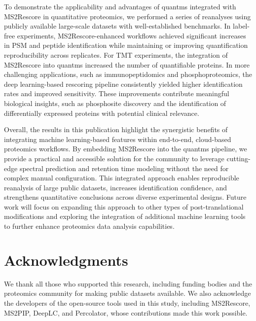\documentclass[12pt]{article}
\begin{document}
To demonstrate the applicability and advantages of quantms integrated with MS2Rescore in quantitative proteomics, we performed a series of reanalyses using publicly available large-scale datasets with well-established benchmarks. In label-free experiments, MS2Rescore-enhanced workflows achieved significant increases in PSM and peptide identification while maintaining or improving quantification reproducibility across replicates. For TMT experiments, the integration of MS2Rescore into quantms increased the number of quantifiable proteins. In more challenging applications, such as immunopeptidomics and phosphoproteomics, the deep learning-based rescoring pipeline consistently yielded higher identification rates and improved sensitivity. These improvements contribute meaningful biological insights, such as phosphosite discovery and the identification of differentially expressed proteins with potential clinical relevance.

Overall, the results in this publication highlight the synergistic benefits of integrating machine learning-based features within end-to-end, cloud-based proteomics workflows. By embedding MS2Rescore into the quantms pipeline, we provide a practical and accessible solution for the community to leverage cutting-edge spectral prediction and retention time modeling without the need for complex manual configuration. This integrated approach enables reproducible reanalysis of large public datasets, increases identification confidence, and strengthens quantitative conclusions across diverse experimental designs. Future work will focus on expanding this approach to other types of post-translational modifications and exploring the integration of additional machine learning tools to further enhance proteomics data analysis capabilities.

\section*{Acknowledgments}
We thank all those who supported this research, including funding bodies and the proteomics community for making public datasets available. We also acknowledge the developers of the open-source tools used in this study, including MS2Rescore, MS2PIP, DeepLC, and Percolator, whose contributions made this work possible.


\end{document}
